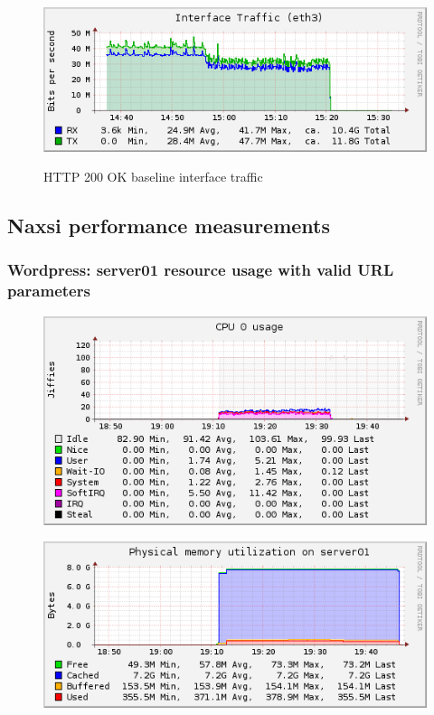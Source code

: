 \documentclass[Measurement results]{subfiles}
\begin{document}
\begin{figure}[H]
\centering
\caption{HTTP 200 OK baseline interface traffic}
\includegraphics[scale=0.7]{images/results/baseline_200/interface.png}
\label{fig:Baseline Nginx interface traffic}
\end{figure}

\newpage
\subsection{Naxsi performance measurements}
\label{sec:Naxsi performance measurements}

\subsubsection{Wordpress: server01 resource usage with valid URL parameters}
\begin{figure}[H]
\centering
\includegraphics[scale=0.7]{images/results/wp_with_naxsi_incremented_allowed_parameters/cpu.png}
\end{figure}

\begin{figure}[H]
\centering
\includegraphics[scale=0.7]{images/results/wp_with_naxsi_incremented_allowed_parameters/memory.png}
\end{figure}
\end{document}
